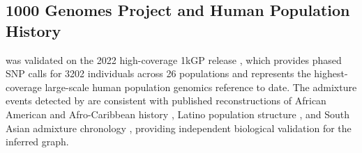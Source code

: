 \subsection*{1000 Genomes Project and Human Population History}

\hapgraph{} was validated on the 2022 high-coverage 1kGP release
\citep{ByrskaBishop2022}, which provides phased SNP calls for 3202 individuals
across 26 populations and represents the highest-coverage large-scale human
population genomics reference to date.
The admixture events detected by \hapgraph{} are consistent with published
reconstructions of African American and Afro-Caribbean history
\citep{Bryc2015}, Latino population structure \citep{Moreno-Estrada2013},
and South Asian admixture chronology \citep{Moorjani2013}, providing
independent biological validation for the inferred graph.
